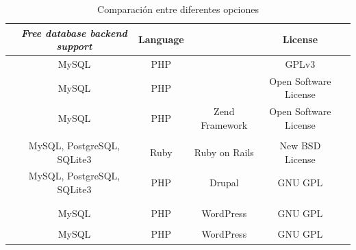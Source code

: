\begin{table}[h!]
    \tiny
   
\begin{tabular}{ |l|c|c|c|c|c| }

\hline
	&
	\textit{Free database backend support}&
	Language&
	\textit{\gloss{waf}}&
	License&

\\ \hline
	\nameOpenCart &
	MySQL&
	PHP&
	&
	GPLv3&
	
\\ \hline
	\namePrestaShop &
	MySQL&
	PHP&
	&
	Open Software License&
	
\\ \hline
	\nameMagento &
	MySQL&
	PHP&
	Zend Framework\cite{online_zend_framework}&
	Open Software License&
	
\\ \hline
	\nameZenCart &
	&
	&
	&
	&
 
\\ \hline
	\nameSpreeCommerce &
	MySQL, PostgreSQL, SQLite3&
	Ruby\cite{online_ruby_language}&
	Ruby on Rails\cite{online_ruby_rails}&
	New BSD License&

\\ \hline
	\nameDrupalCommerce &
	MySQL, PostgreSQL, SQLite3&
	PHP&
	Drupal\cite{online_drupal}&
	GNU GPL&
	
\\ \hline
	\nameOsCommerce &
	&
	&
	&
	&

\\ \hline
	\nameSimpleCart &
	&
	&
	&
	&
	
\\ \hline
	\nameWooCommerce &
	MySQL&
	PHP&
	WordPress\cite{online_wordpress}&
	GNU GPL&
	
\\ \hline
	\nameWPECommerce &
	&
	&
	&
	&
	
\\ \hline
	\nameJigoshop &
	MySQL&
	PHP&
	WordPress\cite{online_wordpress}&
	GNU GPL&
	
\\ \hline
\end{tabular}
    \caption{ Comparación entre diferentes opciones \ecommerce}
    \label{tab:wide_table}
\end{table}

